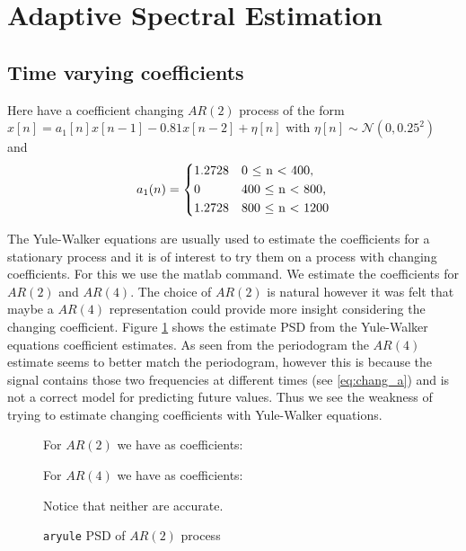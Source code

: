 \documentclass[10pt,twoside,a4paper]{report}
\begin{document}
\section{Adaptive Spectral Estimation}
\subsection{Time varying coefficients}

Here have a coefficient changing $AR(2)$ process of the form $x[n]=a_1[n]x[n-1]-0.81x[n-2]+\eta[n]$ with $\eta[n]\sim \mathcal{N}(0,0.25^2)$ and
\begin{equation}
a_1(n) = \begin{dcases*}
        1.2728  & 0 $\leq$ n $<$ 400,\\
        0  & 400 $\leq$ n $<$ 800,\\
        1.2728  & 800 $\leq$ n $<$ 1200\\
        \end{dcases*}
        \label{eq:chang_a}
\end{equation} 

The Yule-Walker equations are usually used to estimate the coefficients for a stationary process and it is of interest to try them on a process with changing coefficients. For this we use the matlab  command. We estimate the coefficients for $AR(2)$ and $AR(4)$. The choice of $AR(2)$ is natural however it was felt that maybe a $AR(4)$ representation could provide more insight considering the changing coefficient. Figure \ref{fig:4_3a1} shows the estimate PSD from the Yule-Walker equations coefficient estimates. As seen from the periodogram the $AR(4)$ estimate seems to better match the periodogram, however this is because the signal contains those two frequencies at different times (see \ref{eq:chang_a}) and is not a correct model for predicting future values. Thus we see the weakness of trying to estimate changing coefficients with Yule-Walker equations.

\begin{figure}[h]
\centering
\resizebox{\textwidth}{!}{}
For $AR(2)$ we have as coefficients: 

For $AR(4)$ we have as coefficients: 

Notice that neither are accurate.
\caption{\texttt{aryule} PSD of $AR(2)$ process}
\label{fig:4_3a1}
\end{figure}
\end{document}
